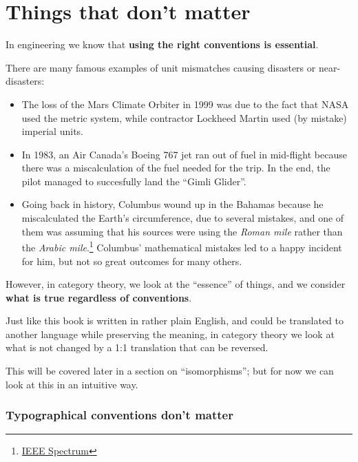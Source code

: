 \section{Things that don't matter}

In engineering we know that \textbf{using the right conventions is essential}.

There are many famous examples of unit mismatches causing disasters or near-disasters:
\begin{itemize}
  \item The loss of the Mars Climate Orbiter in 1999 was due to the fact that NASA used the metric system,
  while contractor Lockheed Martin used (by mistake) imperial units.
  \item In 1983, an Air Canada’s Boeing 767 jet ran out of fuel in mid-flight because
  there was a miscalculation of the fuel needed for the trip. In the end, the pilot managed to succesfully land the ``Gimli Glider''.
  \item
  Going back in history, Columbus wound up in the Bahamas because he miscalculated
  the Earth's circumference, due to several mistakes, and one of them was assuming
  that his sources were using the \emph{Roman mile} rather than the \emph{Arabic mile}.\footnote{
    \href{https://spectrum.ieee.org/tech-talk/at-work/test-and-measurement/columbuss-geographical-miscalculations}{IEEE Spectrum}
  }
  Columbus' mathematical mistakes led to a happy incident for him, but not so great outcomes for many others.
\end{itemize}

However, in category theory, we look at the ``essence'' of things, and we consider \textbf{what is true regardless of conventions}.

Just like this book is written in rather plain English, and could be translated to another language while preserving the meaning, in category theory we look at what is not changed by a 1:1 translation that can be reversed.

This will be covered later in a section on ``isomorphisms''; but for now we can look at this in an intuitive way.

\subsubsection{Typographical conventions don't matter}

